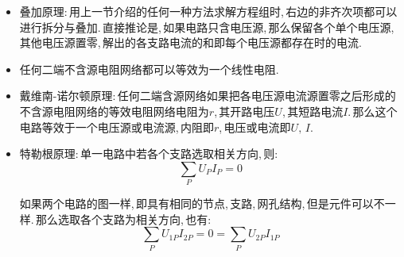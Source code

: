 

\begin{itemize}
\item 叠加原理:\,用上一节介绍的任何一种方法求解方程组时,\,右边的非齐次项都可以进行拆分与叠加.\,直接推论是,\,如果电路只含电压源,\,那么保留各个单个电压源,\,其他电压源置零,\,解出的各支路电流的和即每个电压源都存在时的电流.

\item 任何二端不含源电阻网络都可以等效为一个线性电阻.

\item 戴维南-诺尔顿原理:\,任何二端含源网络如果把各电压源电流源置零之后形成的不含源电阻网络的等效电阻网络电阻为$r$,\,其开路电压$U$,\,其短路电流$I$.\,那么这个电路等效于一个电压源或电流源,\,内阻即$r$,\,电压或电流即$U,\,I$.

\item 特勒根原理:\,单一电路中若各个支路选取相关方向,\,则:
\[\sum_P U_PI_P=0\]

如果两个电路的图一样,\,即具有相同的节点,\,支路,\,网孔结构,\,但是元件可以不一样.\,那么选取各个支路为相关方向,\,也有:
\[\sum_P U_{1P}I_{2P}=0=\sum_P U_{2P}I_{1P}\]
\end{itemize}


